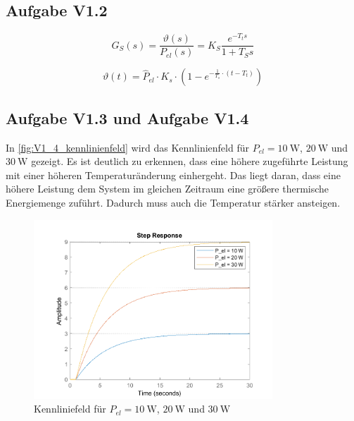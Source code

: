 \subsection{Aufgabe V1.2}


\[ G_{S}(s) = \frac{\vartheta(s)}{P_{el}(s)} = K_{S} \frac{e^{-T_{t}s}}{1 + T_{S}s} \]
\[ \]


\[ \vartheta\left(t\right) = \hat{P}_{el} \cdot K_s \cdot \left(1-e^{-\frac{1}{T_s}\cdot\left(t-T_t\right) }\right) \]

\subsection{Aufgabe V1.3 und Aufgabe V1.4}



In \autoref{fig:V1_4_kennlinienfeld} wird das Kennlinienfeld für \( P_{el} = \SI{10}{\watt}\), \(\SI{20}{\watt}\) und \(\SI{30}{\watt}\) gezeigt. Es ist deutlich zu erkennen, dass eine höhere zugeführte Leistung mit einer höheren Temperaturänderung einhergeht. Das liegt daran, dass eine höhere Leistung dem System im gleichen Zeitraum eine größere thermische Energiemenge zuführt. Dadurch muss auch die Temperatur stärker ansteigen.

\begin{figure}[H]
    \begin{center}
        \includegraphics[width=0.8\textwidth]{img/V1_4.png}
        \caption{Kennliniefeld für \( P_{el} = \SI{10}{\watt}\), \(\SI{20}{\watt}\) und \(\SI{30}{\watt}\)}
        \label{fig:V1_4_kennlinienfeld}
    \end{center}
\end{figure}

